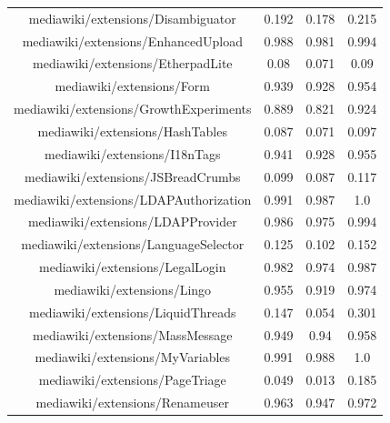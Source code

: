 \begin{table}[H]
\begin{tabular}{@{}c c c c@{}}
mediawiki/extensions/Disambiguator & 0.192 & 0.178 & 0.215 \\
mediawiki/extensions/EnhancedUpload & 0.988 & 0.981 & 0.994 \\
mediawiki/extensions/EtherpadLite & 0.08 & 0.071 & 0.09 \\
mediawiki/extensions/Form & 0.939 & 0.928 & 0.954 \\
mediawiki/extensions/GrowthExperiments & 0.889 & 0.821 & 0.924 \\
mediawiki/extensions/HashTables & 0.087 & 0.071 & 0.097 \\
mediawiki/extensions/I18nTags & 0.941 & 0.928 & 0.955 \\
mediawiki/extensions/JSBreadCrumbs & 0.099 & 0.087 & 0.117 \\
mediawiki/extensions/LDAPAuthorization & 0.991 & 0.987 & 1.0 \\
mediawiki/extensions/LDAPProvider & 0.986 & 0.975 & 0.994 \\
mediawiki/extensions/LanguageSelector & 0.125 & 0.102 & 0.152 \\
mediawiki/extensions/LegalLogin & 0.982 & 0.974 & 0.987 \\
mediawiki/extensions/Lingo & 0.955 & 0.919 & 0.974 \\
mediawiki/extensions/LiquidThreads & 0.147 & 0.054 & 0.301 \\
mediawiki/extensions/MassMessage & 0.949 & 0.94 & 0.958 \\
mediawiki/extensions/MyVariables & 0.991 & 0.988 & 1.0 \\
mediawiki/extensions/PageTriage & 0.049 & 0.013 & 0.185 \\
mediawiki/extensions/Renameuser & 0.963 & 0.947 & 0.972 \\
\hline
\end{tabular}
    \label{table:accuracy-score-repo-specific-and-generic-voted-appendix-c-part-1}
\end{table}

